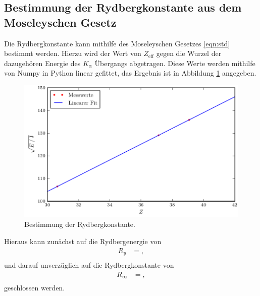 \subsection{Bestimmung der Rydbergkonstante aus dem Moseleyschen Gesetz}
Die Rydbergkonstante kann mithilfe des Moseleyschen Gesetzes \eqref{eqn:std} bestimmt werden.
Hierzu wird der Wert von $Z_\text{eff}$ gegen die Wurzel der dazugehören Energie des $K_\alpha$ Übergangs abgetragen.
Diese Werte werden mithilfe von Numpy in Python linear gefittet, das Ergebnis ist in Abbildung \ref{fig:plot7} angegeben.
\begin{figure}
  \centering
  \includegraphics{build/plot_ryd.pdf}
  \caption{Bestimmung der Rydbergkonstante.}
  \label{fig:plot7}
\end{figure}
Hieraus kann zunächst auf die Rydbergenergie von
\begin{align*}
  R_y &= , \\
\end{align*}
und darauf unverzüglich auf die Rydbergkonstante von
\begin{align*}
  R_{\infty} &= , \\
\end{align*}
geschlossen werden.


